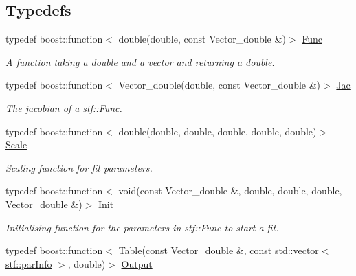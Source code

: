 \subsection*{Typedefs}
\begin{DoxyCompactItemize}
\item 
typedef boost::function$<$ double(double, const Vector\_\-double \&)$>$ \hyperlink{group__stfgen_ga11d6ec55abceacf5fdd47f9fc889d9a3}{Func}
\begin{DoxyCompactList}\small\item\em A function taking a double and a vector and returning a double. \item\end{DoxyCompactList}\item 
\hypertarget{group__stfgen_ga77f3e621f1771784f2befaeb3d1ac4fb}{
typedef boost::function$<$ Vector\_\-double(double, const Vector\_\-double \&)$>$ \hyperlink{group__stfgen_ga77f3e621f1771784f2befaeb3d1ac4fb}{Jac}}
\label{group__stfgen_ga77f3e621f1771784f2befaeb3d1ac4fb}

\begin{DoxyCompactList}\small\item\em The jacobian of a stf::Func. \item\end{DoxyCompactList}\item 
\hypertarget{group__stfgen_ga775530afebda38e8138e8eb1401a0e01}{
typedef boost::function$<$ double(double, double, double, double, double)$>$ \hyperlink{group__stfgen_ga775530afebda38e8138e8eb1401a0e01}{Scale}}
\label{group__stfgen_ga775530afebda38e8138e8eb1401a0e01}

\begin{DoxyCompactList}\small\item\em Scaling function for fit parameters. \item\end{DoxyCompactList}\item 
\hypertarget{group__stfgen_ga15ccefdb3c4b758564e73f080639ff98}{
typedef boost::function$<$ void(const Vector\_\-double \&, double, double, double, Vector\_\-double \&)$>$ \hyperlink{group__stfgen_ga15ccefdb3c4b758564e73f080639ff98}{Init}}
\label{group__stfgen_ga15ccefdb3c4b758564e73f080639ff98}

\begin{DoxyCompactList}\small\item\em Initialising function for the parameters in stf::Func to start a fit. \item\end{DoxyCompactList}\item 
\hypertarget{group__stfgen_ga66542f63882a99158a17cdc977eac5e8}{
typedef boost::function$<$ \hyperlink{classstf_1_1Table}{Table}(const Vector\_\-double \&, const std::vector$<$ \hyperlink{structstf_1_1parInfo}{stf::parInfo} $>$, double)$>$ \hyperlink{group__stfgen_ga66542f63882a99158a17cdc977eac5e8}{Output}}
\label{group__stfgen_ga66542f63882a99158a17cdc977eac5e8}


\end{DoxyCompactItemize}
